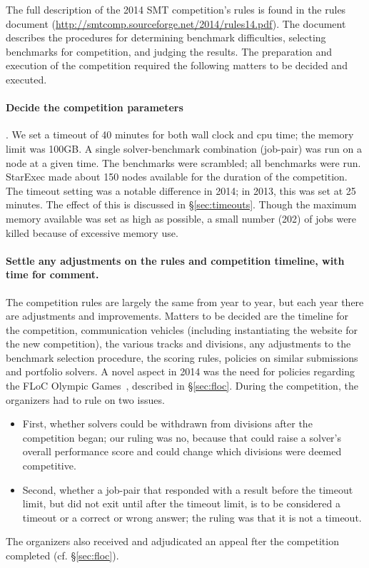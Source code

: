 \documentclass[twoside,11pt]{article}
\begin{document}
The full description of the 2014 SMT competition's rules is found in the rules document (\url{http://smtcomp.sourceforge.net/2014/rules14.pdf}). The document describes the procedures for determining benchmark difficulties, selecting benchmarks for competition, and judging the results. The preparation and execution of the competition required the following matters to be decided and executed.

\paragraph{Decide the competition parameters}. We set a timeout of 40 minutes for both wall clock and cpu time; the memory limit was 100GB. A single solver-benchmark combination (job-pair) was run on a node at a given time. The benchmarks were scrambled; all benchmarks were run. StarExec made about 150 nodes available for the duration of the competition. The timeout setting was a notable difference in 2014; in 2013, this was set at 25 minutes. The effect of this is discussed in \S\ref{sec:timeouts}. Though the maximum memory available was set as high as possible, a small number (202) of jobs were killed because of excessive memory use.

\paragraph{Settle any adjustments on the rules and competition timeline, with time for comment.} 
The competition rules are largely the same from year to year, but each year there are adjustments and improvements. Matters to be decided are the timeline for the competition, communication vehicles (including instantiating the website for the new competition), the various tracks and divisions, any adjustments to the benchmark selection procedure, the scoring rules, policies on similar submissions and portfolio solvers. A novel aspect in 2014 was the need for policies regarding the FLoC Olympic Games~\cite{FLoCGames}, described in \S\ref{sec:floc}. During the competition, the organizers had to rule on two issues. 
\begin{itemize}[noitemsep,nolistsep]
\item First, whether solvers could be withdrawn from divisions after the competition began; our ruling was no, because that could raise a solver's overall performance score and could change which divisions were deemed competitive. 
\item Second, whether a job-pair that responded with a result before the timeout limit, but did not exit until after the timeout limit, is to be considered a timeout or a correct or wrong answer; the ruling was that it is not a timeout.
\end{itemize}
The organizers also received and adjudicated an appeal fter the competition completed (cf. \S\ref{sec:floc}).
\end{document}
